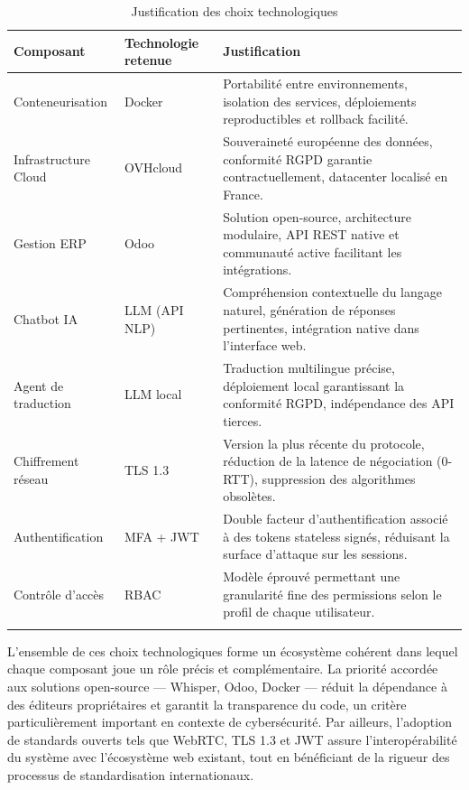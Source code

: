 \begin{longtable}{|m{3cm}|m{3.5cm}|m{6.5cm}|}
\hline
\textbf{Composant} & \textbf{Technologie retenue} & \textbf{Justification} \\
\hline
\endhead
\endfoot
\endlastfoot
\hline
Conteneurisation & Docker & Portabilité entre environnements, isolation des services, déploiements reproductibles et rollback facilité. \\
\hline
Infrastructure Cloud & OVHcloud & Souveraineté européenne des données, conformité RGPD garantie contractuellement, datacenter localisé en France. \\
\hline
Gestion ERP & Odoo & Solution open-source, architecture modulaire, API REST native et communauté active facilitant les intégrations. \\
\hline
Chatbot IA & LLM (API NLP) & Compréhension contextuelle du langage naturel, génération de réponses pertinentes, intégration native dans l'interface web. \\
\hline
Agent de traduction & LLM local & Traduction multilingue précise, déploiement local garantissant la conformité RGPD, indépendance des API tierces. \\
\hline
Chiffrement réseau & TLS 1.3 & Version la plus récente du protocole, réduction de la latence de négociation (0-RTT), suppression des algorithmes obsolètes. \\
\hline
Authentification & MFA + JWT & Double facteur d'authentification associé à des tokens stateless signés, réduisant la surface d'attaque sur les sessions. \\
\hline
Contrôle d'accès & RBAC & Modèle éprouvé permettant une granularité fine des permissions selon le profil de chaque utilisateur. \\
\hline
\captionsetup{justification=centering,margin=2cm}
\caption{Justification des choix technologiques}
\label{tab:choix_techno}
\end{longtable}

L'ensemble de ces choix technologiques forme un écosystème cohérent dans lequel chaque composant joue un rôle précis et complémentaire. La priorité accordée aux solutions open-source — Whisper, Odoo, Docker — réduit la dépendance à des éditeurs propriétaires et garantit la transparence du code, un critère particulièrement important en contexte de cybersécurité. Par ailleurs, l'adoption de standards ouverts tels que WebRTC, TLS 1.3 et JWT assure l'interopérabilité du système avec l'écosystème web existant, tout en bénéficiant de la rigueur des processus de standardisation internationaux.

